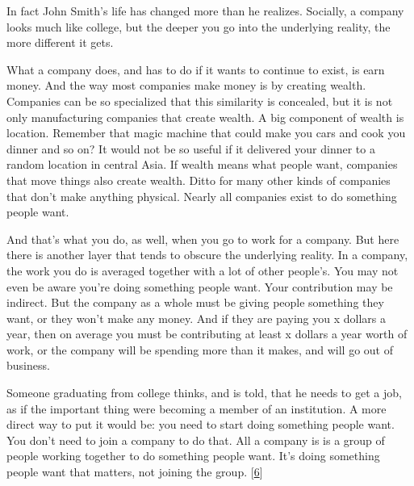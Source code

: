 In fact John Smith's life has
                    changed more than he realizes. Socially, a company looks
                    much like college, but the deeper you go into the underlying
                    reality, the more different it gets.

What a
                    company does, and has to do if it wants to continue to
                    exist, is earn money. And the way most companies make money
                    is by creating wealth. Companies can be so specialized that
                    this similarity is concealed, but it is not only
                    manufacturing companies that create wealth. A big component
                    of wealth is location. Remember that magic machine that
                    could make you cars and cook you dinner and so on? It would
                    not be so useful if it delivered your dinner to a random
                    location in central Asia. If wealth means what people want,
                    companies that move things also create wealth. Ditto for
                    many other kinds of companies that don't make anything
                    physical. Nearly all companies exist to do something people
                    want.

And that's what you do, as well, when you
                    go to work for a company. But here there is another layer
                    that tends to obscure the underlying reality. In a company,
                    the work you do is averaged together with a lot of other
                    people's. You may not even be aware you're doing something
                    people want. Your contribution may be indirect. But the
                    company as a whole must be giving people something they
                    want, or they won't make any money. And if they are paying
                    you x dollars a year, then on average you must be
                    contributing at least x dollars a year worth of work, or the
                    company will be spending more than it makes, and will go out
                    of business.

Someone graduating from college
                    thinks, and is told, that he needs to get a job, as if the
                    important thing were becoming a member of an institution. A
                    more direct way to put it would be: you need to start doing
                    something people want. You don't need to join a company to
                    do that. All a company is is a group of people working
                    together to do something people want. It's doing something
                    people want that matters, not joining the group.
                    [\href{\#f6n}{6}]

